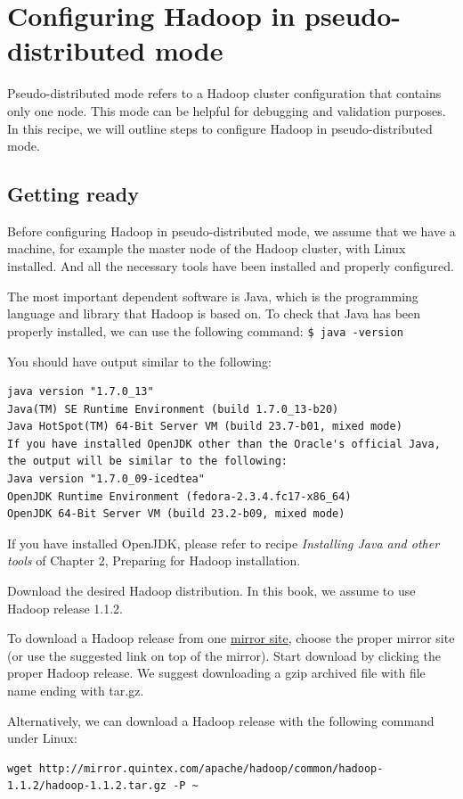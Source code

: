 \section{Configuring Hadoop in pseudo-distributed mode}
Pseudo-distributed mode refers to a Hadoop cluster configuration that contains only one node. This mode can be helpful for debugging and validation purposes. In this recipe, we will outline steps to configure Hadoop in pseudo-distributed mode.
\subsection*{Getting ready}
Before configuring Hadoop in pseudo-distributed mode, we assume that we have a machine, for example the master node of the Hadoop cluster, with Linux installed. And all the necessary tools have been installed and properly configured.

The most important dependent software is Java, which is the programming language and library that Hadoop is based on. To check that Java has been properly installed,
we can use the following command:
\verb|$ java -version|

You should have output similar to the following:
\begin{verbatim}
java version "1.7.0_13"
Java(TM) SE Runtime Environment (build 1.7.0_13-b20)
Java HotSpot(TM) 64-Bit Server VM (build 23.7-b01, mixed mode)
If you have installed OpenJDK other than the Oracle's official Java, the output will be similar to the following:
Java version "1.7.0_09-icedtea"
OpenJDK Runtime Environment (fedora-2.3.4.fc17-x86_64)
OpenJDK 64-Bit Server VM (build 23.2-b09, mixed mode)
\end{verbatim}

If you have installed OpenJDK, please refer to recipe \emph{Installing Java and other tools} of Chapter 2, Preparing for Hadoop installation.

Download the desired Hadoop distribution. In this book, we assume to use Hadoop release 1.1.2.

To download a Hadoop release from one \href{http://www.apache.org/dyn/closer.cgi/hadoop/common/}{mirror site}, choose the proper mirror site (or use the suggested link on top of the mirror). Start download by clicking the proper Hadoop release. We suggest downloading a gzip archived file with file name ending with tar.gz.

Alternatively, we can download a Hadoop release with the following command under Linux:
\begin{verbatim}
wget http://mirror.quintex.com/apache/hadoop/common/hadoop-1.1.2/hadoop-1.1.2.tar.gz -P ~
\end{verbatim}

